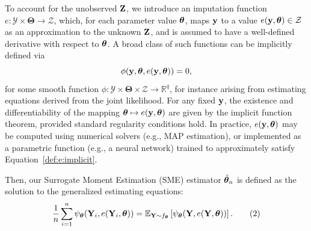 \documentclass[twoside,11pt]{article}
\begin{document}
To account for the unobserved ${\bf Z}$, we introduce an imputation function \(e : \mathcal{Y} \times \bm{\Theta} \to \mathcal{Z}\),
which, for each parameter value ${\bm{\theta}}$, maps ${\bf y}$ to a value \(e({\bf y}, {\bm{\theta}}) \in \mathcal{Z}\) as an approximation to the unknown ${\bf Z}$, and is assumed to have a well-defined derivative with respect to ${\bm{\theta}}$. A broad class of such functions can be implicitly defined via
\begin{equation}
    \phi({\bf y}, {\bm{\theta}}, e({\bf y}, {\bm{\theta}})) = 0,
\label{def:e:implicit}
\end{equation}
for some smooth function \(\phi : \mathcal{Y} \times \bm{\Theta} \times \mathcal{Z} \to \mathbb{R}^q\), for instance arising from estimating equations derived from the joint likelihood. For any fixed ${\bf y}$, the existence and differentiability of the mapping \({\bm{\theta}} \mapsto e({\bf y}, {\bm{\theta}})\) are given by the implicit function theorem, provided standard regularity conditions hold. In practice, \(e({\bf y}, {\bm{\theta}})\) may be computed using numerical solvers (e.g., MAP estimation), or implemented as a parametric function (e.g., a neural network) trained to approximately satisfy Equation~\eqref{def:e:implicit}.

Then, our Surrogate Moment Estimation (SME) estimator $\hat{{\bm{\theta}}}_n$ is defined as the solution to the generalized estimating equations:
\begin{equation}
\frac{1}{n} \sum_{i=1}^n \psi_{\bm{\theta}}({\bf Y}_i, e({\bf Y}_i, {\bm{\theta}})) 
= 
\mathbb{E}_{{\bf Y} \sim f_{\bm{\theta}}} 
\left[ 
\psi_{\bm{\theta}}({\bf Y}, e({\bf Y}, {\bm{\theta}})) 
\right].
\tag{2}
\end{equation}
\end{document}
